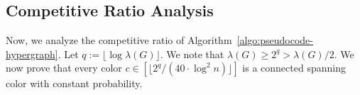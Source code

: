\documentclass[11pt]{article}
\newtheorem{corollary}{Corollary}
\theoremstyle{definition}
\newcommand{\good}{\mathsf{good}}
\newcommand{\opt}{\texttt{opt}}
\begin{document}
\iffalse
We now restate and prove the main lemma of this section.
\lemmaGoodOpthypergraph*
\begin{proof}
    By Lemma~\ref{lemma:structure-property}, at least $\lambda(G)/2$ hyperedges in every cut of $G$ are good. This implies that $\lambda(H)\geq \frac{1}{2}\lambda(G)$. 
    We recall that $\opt(G)\geq 80\cdot \log^2n$. Hence, we have $$\lambda(H)\geq \frac{\lambda(G)}{2} \geq \frac{\opt(G)}{2} \geq 1,$$
    which implies that $H$ is connected. Hence, $f(E_{\good})=f(E)$.
\end{proof}
\fi

\iffalse
Let $E_{\text{good}}\subseteq E$ be the collection of all good hyperedges in $G$. Let $H:=(V,E_{\text{good}})$ be the subhypergraph of $G$ containing only good hyperedges. Lemma~\ref{lemma:structure-property} implies that removing all bad hyperedges in $G$ will not decrease the minimum cut value by more than a constant factor as summarized in the following corollary. 

\begin{corollary}\label{corollary:good-hyperedge-property}
    $\lambda(H)\geq\lambda(G)/2$.
\end{corollary}
\fi

\subsection{Competitive Ratio Analysis}\label{subsection:raio-analysis}


Now, we analyze the competitive ratio of Algorithm~\ref{algo:pseudocode-hypergraph}. Let $q:=\lfloor \log \lambda(G)\rfloor$. We note that $\lambda(G)\geq 2^q> \lambda(G)/2$. We now prove that every color $c \in [\lfloor 2^q/(40\cdot \log ^2n) \rfloor]$ is a connected spanning color with constant probability.
\end{document}

